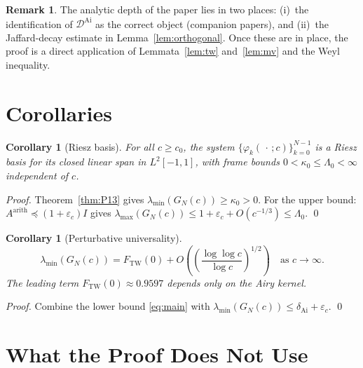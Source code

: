 \documentclass[12pt,a4paper]{amsart}
\newtheorem{corollary}[theorem]{Corollary}
\theoremstyle{definition}
\newtheorem{remark}[theorem]{Remark}
\newcommand{\DAi}{\mathcal{D}^{\mathrm{Ai}}}
\newcommand{\GN}{G_N(c)}
\newcommand{\FTW}{F_{\mathrm{TW}}(0)}
\newcommand{\dAi}{\delta_{\mathrm{Ai}}}
\begin{document}
\begin{remark}
The analytic depth of the paper lies in two places:
(i)~the identification of $\DAi$ as the correct object (companion papers),
and (ii)~the Jaffard-decay estimate in Lemma~\ref{lem:orthogonal}.
Once these are in place, the proof is a direct application of
Lemmata~\ref{lem:tw} and~\ref{lem:mv} and the Weyl inequality.
\end{remark}

\section{Corollaries}
\label{sec:corollaries}

\begin{corollary}[Riesz basis]\label{cor:riesz}
For all $c \ge c_0$, the system $\{\varphi_k(\,\cdot\,;c)\}_{k=0}^{N-1}$
is a Riesz basis for its closed linear span in $L^2[-1,1]$,
with frame bounds $0 < \kappa_0 \le \Lambda_0 < \infty$ independent of $c$.
\end{corollary}

\begin{proof}
Theorem~\ref{thm:P13} gives $\lambda_{\min}(\GN) \ge \kappa_0 > 0$.
For the upper bound: $A^{\mathrm{arith}} \preceq (1+\varepsilon_c)I$
gives $\lambda_{\max}(\GN) \le 1 + \varepsilon_c + O(c^{-1/3}) \le \Lambda_0$. \qed
\end{proof}

\begin{corollary}[Perturbative universality]\label{cor:universality}
\begin{equation}\label{eq:universality}
  \lambda_{\min}(\GN)
  = \FTW + O\!\left(\left(\frac{\log\log c}{\log c}\right)^{1/2}\right)
  \quad\text{as }c\to\infty.
\end{equation}
The leading term $\FTW \approx 0.9597$ depends only on the Airy kernel.
\end{corollary}

\begin{proof}
Combine the lower bound \eqref{eq:main} with
$\lambda_{\min}(\GN) \le \dAi + \varepsilon_c$. \qed
\end{proof}

\section{What the Proof Does Not Use}\label{sec:notuse}
\end{document}

